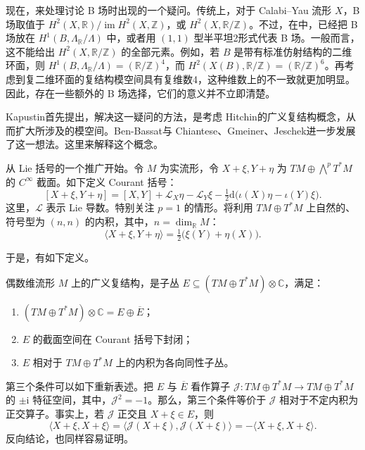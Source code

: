 现在，来处理讨论 B 场时出现的一个疑问。传统上，对于 Calabi--Yau 流形 $X$，B 场取值于 $H^2(X,\mathbb R)/\operatorname{im}H^2(X,\mathbb Z)$，或 $H^2(X,\mathbb R/\mathbb Z)$。不过，在中，已经把 B 场放在 $H^1(B,\Lambda_{\mathbb R}/\Lambda)$ 中，或者用 $(1,1)$ 型半平坦2形式代表 B 场。一般而言，这不能给出 $H^2(X,\mathbb R/\mathbb Z)$ 的全部元素。例如，若 $B$ 是带有标准仿射结构的二维环面，则 $H^1(B,\Lambda_{\mathbb R}/\Lambda)=(\mathbb R/\mathbb Z)^4$，而 $H^2(X(B),\mathbb R/\mathbb Z)=(\mathbb R/\mathbb Z)^6$。再考虑到复二维环面的复结构模空间具有复维数4，这种维数上的不一致就更加明显。因此，存在一些额外的 B 场选择，它们的意义并不立即清楚。

Kapustin首先提出，解决这一疑问的方法，是考虑 Hitchin的广义复结构概念，从而扩大所涉及的模空间。Ben-Bassat与 Chiantese、Gmeiner、Jeschek进一步发展了这一想法。这里来解释这个概念。

从 Lie 括号的一个推广开始。令 $M$ 为实流形，令 $X+\xi,Y+\eta$ 为 $TM\oplus\bigwedge^pT^*M$ 的 $C^\infty$ 截面。如下定义 Courant 括号：
\[
[X+\xi,Y+\eta]
=[X,Y]+\mathcal L_X\eta-\mathcal L_Y\xi
-\tfrac12\mathrm d\bigl(\iota(X)\eta-\iota(Y)\xi\bigr).
\]
这里，$\mathcal L$ 表示 Lie 导数。特别关注 $p=1$ 的情形。将利用 $TM\oplus T^*M$ 上自然的、符号型为 $(n,n)$ 的内积，其中，$n=\dim_{\mathbb R}M$：
\[
\langle X+\xi,Y+\eta\rangle
=\tfrac12\bigl(\xi(Y)+\eta(X)\bigr).
\]

于是，有如下定义。

\begin{definition}\label{def:6.33}
偶数维流形 $M$ 上的广义复结构，是子丛 $E\subseteq(TM\oplus T^*M)\otimes\mathbb C$，满足：
\begin{enumerate}[label=(\arabic*)]
\item $(TM\oplus T^*M)\otimes\mathbb C=E\oplus\overline E$；
\item $E$ 的截面空间在 Courant 括号下封闭；
\item $E$ 相对于 $TM\oplus T^*M$ 上的内积为各向同性子丛。
\end{enumerate}
\end{definition}

第三个条件可以如下重新表述。把 $E$ 与 $\overline E$ 看作算子 $\mathcal J\colon TM\oplus T^*M\to TM\oplus T^*M$ 的 $\pm\mathrm i$ 特征空间，其中，$\mathcal J^2=-1$。那么，第三个条件等价于 $\mathcal J$ 相对于不定内积为正交算子。事实上，若 $\mathcal J$ 正交且 $X+\xi\in E$，则
\[
\langle X+\xi,X+\xi\rangle
=\langle\mathcal J(X+\xi),\mathcal J(X+\xi)\rangle
=-\langle X+\xi,X+\xi\rangle.
\]
反向结论，也同样容易证明。

